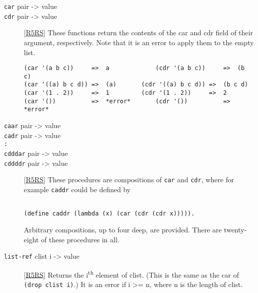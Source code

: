 \begin{description}
\item[\texttt{car} pair -\textgreater{} value\\
\texttt{cdr} pair -\textgreater{} value ]
{[}\protect\hyperlink{R5RS}{R5RS}{]} These functions return the contents
of the car and cdr field of their argument, respectively. Note that it
is an error to apply them to the empty list.

\begin{verbatim}
(car '(a b c))     =>  a             (cdr '(a b c))     =>  (b c)  
(car '((a) b c d)) =>  (a)       (cdr '((a) b c d)) =>  (b c d)
(car '(1 . 2))     =>  1         (cdr '(1 . 2))     =>  2      
(car '())          =>  *error*       (cdr '())          =>  *error*
\end{verbatim}

\href{}{} \href{}{} \href{}{} \href{}{}
\item[\texttt{caar} pair -\textgreater{} value\\
\texttt{cadr} pair -\textgreater{} value\\
\texttt{:}\\
\texttt{cdddar} pair -\textgreater{} value\\
\texttt{cddddr} pair -\textgreater{} value ]
{[}\protect\hyperlink{R5RS}{R5RS}{]} These procedures are compositions
of \texttt{car} and \texttt{cdr}, where for example \texttt{caddr} could
be defined by

\begin{verbatim}
    
(define caddr (lambda (x) (car (cdr (cdr x))))).
\end{verbatim}

Arbitrary compositions, up to four deep, are provided. There are
twenty-eight of these procedures in all. \href{}{}
\item[\texttt{list-ref} clist i -\textgreater{} value ]
{[}\protect\hyperlink{R5RS}{R5RS}{]} Returns the i\textsuperscript{th}
element of clist. (This is the same as the car of
\texttt{(drop\ clist\ i)}.) It is an error if i \textgreater{}= n, where
n is the length of clist.

\begin{verbatim}
    

\end{verbatim}
\end{description}
